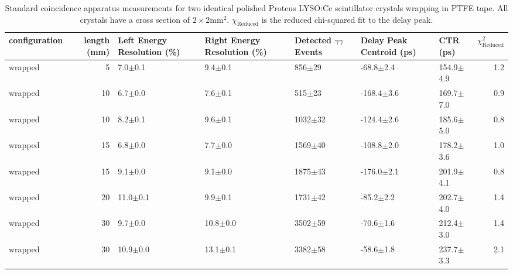 \begin{table}
\caption{\label{tab:standardctr} Standard coincidence apparatus measurements for two identical polished Proteus LYSO:Ce scintillator crystals wrapping in PTFE tape. All crystals have a cross section of $2\times2$mm$^2$. $\chi_\text{Reduced}$ is the reduced chi-squared fit to the delay peak.}
\begin{tabular}{lrlllllr}
configuration &  length (mm) & Left Energy Resolution (\%) & Right Energy Resolution (\%) & Detected $\gamma\gamma$ Events & Delay Peak Centroid (ps) & CTR (ps) &  $\chi^2_\text{Reduced}$ \\
\hline
      wrapped &      5 &   7.0$\pm$0.1 &   9.4$\pm$0.1 &   856$\pm$29 &   -68.8$\pm$2.4 &  154.9$\pm$4.9 &        1.2 \\
      wrapped &     10 &   6.7$\pm$0.0 &   7.6$\pm$0.1 &   515$\pm$23 &  -168.4$\pm$3.6 &  169.7$\pm$7.0 &        0.9 \\
      wrapped &     10 &   8.2$\pm$0.1 &   9.6$\pm$0.1 &  1032$\pm$32 &  -124.4$\pm$2.6 &  185.6$\pm$5.0 &        0.8 \\
      wrapped &     15 &   6.8$\pm$0.0 &   7.7$\pm$0.0 &  1569$\pm$40 &  -108.8$\pm$2.0 &  178.2$\pm$3.6 &        1.0 \\
      wrapped &     15 &   9.1$\pm$0.0 &   9.1$\pm$0.0 &  1875$\pm$43 &  -176.0$\pm$2.1 &  201.9$\pm$4.1 &        0.8 \\
      wrapped &     20 &  11.0$\pm$0.1 &   9.9$\pm$0.1 &  1731$\pm$42 &   -85.2$\pm$2.2 &  202.7$\pm$4.0 &        1.4 \\
      wrapped &     30 &   9.7$\pm$0.0 &  10.8$\pm$0.0 &  3502$\pm$59 &   -70.6$\pm$1.6 &  212.4$\pm$3.0 &        1.4 \\
      wrapped &     30 &  10.9$\pm$0.0 &  13.1$\pm$0.1 &  3382$\pm$58 &   -58.6$\pm$1.8 &  237.7$\pm$3.3 &        2.1 \\
\hline
\end{tabular}
\end{table}
